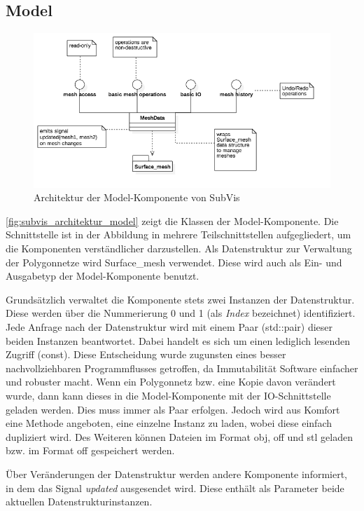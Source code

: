 \subsection{Model}

\begin{figure}
  \centering
  \includegraphics[width=\textwidth]{content/media/subvis_architektur_model.png}
  \caption{Architektur der Model-Komponente von SubVis}
  \label{fig:subvis_architektur_model}
\end{figure}

\autoref{fig:subvis_architektur_model} zeigt die Klassen der Model-Komponente.
Die Schnittstelle ist in der Abbildung in mehrere Teilschnittstellen aufgegliedert, um die Komponenten verständlicher darzustellen.
Als Datenstruktur zur Verwaltung der Polygonnetze wird Surface\_mesh verwendet.
Diese wird auch als Ein- und Ausgabetyp der Model-Komponente benutzt.

Grundsätzlich verwaltet die Komponente stets zwei Instanzen der Datenstruktur.
Diese werden über die Nummerierung 0 und 1 (als \emph{Index} bezeichnet) identifiziert.
Jede Anfrage nach der Datenstruktur wird mit einem Paar (std::pair) dieser beiden Instanzen beantwortet. 
Dabei handelt es sich um einen lediglich lesenden Zugriff (const).
Diese Entscheidung wurde zugunsten eines besser nachvollziehbaren Programmflusses getroffen, da Immutabilität Software einfacher und robuster macht.
Wenn ein Polygonnetz bzw. eine Kopie davon verändert wurde, dann kann dieses in die Model-Komponente mit der IO-Schnittstelle geladen werden.
Dies muss immer als Paar erfolgen. 
Jedoch wird aus Komfort eine Methode angeboten, eine einzelne Instanz zu laden, wobei diese einfach dupliziert wird.
Des Weiteren können Dateien im Format obj, off und stl geladen bzw. im Format off gespeichert werden.

Über Veränderungen der Datenstruktur werden andere Komponente informiert, in dem das Signal \emph{updated} ausgesendet wird. 
Diese enthält als Parameter beide aktuellen Datenstrukturinstanzen.

